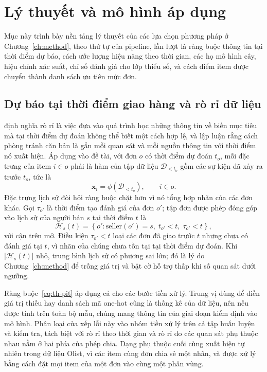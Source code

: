 \documentclass[12pt,a4paper]{report}
\begin{document}
\section{Lý thuyết và mô hình áp dụng}\label{sec:theory-models}

Mục này trình bày nền tảng lý thuyết của các lựa chọn phương pháp ở Chương~\ref{ch:method}, theo thứ tự của pipeline, lần lượt là ràng buộc thông tin tại thời điểm dự báo, cách ước lượng hiệu năng theo thời gian, các họ mô hình cây, hiệu chỉnh xác suất, chỉ số đánh giá cho lớp thiểu số, và cách điểm item được chuyển thành danh sách ưu tiên mức đơn.

\subsection{Dự báo tại thời điểm giao hàng và rò rỉ dữ liệu}\label{sec:th-pit}

\textcite{kaufman2012} định nghĩa rò rỉ là việc đưa vào quá trình học những thông tin về biến mục tiêu mà tại thời điểm dự đoán không thể biết một cách hợp lệ, và lập luận rằng cách phòng tránh căn bản là gắn mỗi quan sát và mỗi nguồn thông tin với thời điểm nó xuất hiện. Áp dụng vào đề tài, với đơn $o$ có thời điểm dự đoán $t_o$, mỗi đặc trưng của item $i \in o$ phải là hàm của tập dữ liệu $\mathcal{D}_{<t_o}$ gồm các sự kiện đã xảy ra trước $t_o$, tức là
\begin{equation}\label{eq:th-pit}
  \mathbf{x}_i = \phi\left(\mathcal{D}_{<t_o}\right), \qquad i \in o .
\end{equation}
Đặc trưng lịch sử đòi hỏi ràng buộc chặt hơn vì nó tổng hợp nhãn của các đơn khác. Gọi $\tau_{o'}$ là thời điểm tạo đánh giá của đơn $o'$; tập đơn được phép đóng góp vào lịch sử của người bán $s$ tại thời điểm $t$ là
\begin{equation}\label{eq:th-history}
  \mathcal{H}_s(t) = \left\{ o' : \mathrm{seller}(o') = s,\; t_{o'} < t,\; \tau_{o'} < t \right\},
\end{equation}
với cận trên mở. Điều kiện $\tau_{o'} < t$ loại các đơn đã giao trước $t$ nhưng chưa có đánh giá tại $t$, vì nhãn của chúng chưa tồn tại tại thời điểm dự đoán. Khi $|\mathcal{H}_s(t)|$ nhỏ, trung bình lịch sử có phương sai lớn; đó là lý do Chương~\ref{ch:method} để trống giá trị và bật cờ hỗ trợ thấp khi số quan sát dưới ngưỡng.

Ràng buộc~\eqref{eq:th-pit} áp dụng cả cho các bước tiền xử lý. Trung vị dùng để điền giá trị thiếu hay danh sách mã one-hot cũng là thống kê của dữ liệu, nên nếu được tính trên toàn bộ mẫu, chúng mang thông tin của giai đoạn kiểm định vào mô hình. Phân loại của \textcite{kapoor2023} xếp lỗi này vào nhóm tiền xử lý trên cả tập huấn luyện và kiểm tra, tách biệt với rò rỉ theo thời gian và rò rỉ do các quan sát phụ thuộc nhau nằm ở hai phía của phép chia. Dạng phụ thuộc cuối cùng xuất hiện tự nhiên trong dữ liệu Olist, vì các item cùng đơn chia sẻ một nhãn, và được xử lý bằng cách đặt mọi item của một đơn vào cùng một phân vùng.
\end{document}
